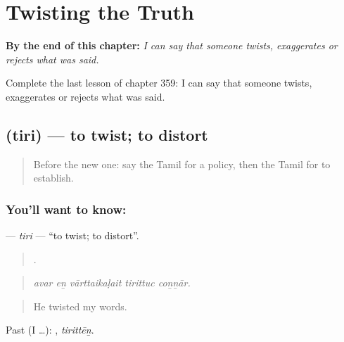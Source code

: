 
\chapter{Twisting the Truth}
\label{ch:ta-twisting-the-truth}

\begin{chapteropening}
\textbf{By the end of this chapter:} \emph{I can say that someone twists, exaggerates or rejects what was said.}

Complete the last lesson of chapter 359: I can say that someone twists, exaggerates or rejects what was said.
\end{chapteropening}

\section[\texorpdfstring{\ta{திரி} (tiri)}{திரி (tiri)}]{ (tiri) — to twist; to distort}

\label{lesson:TA-C359-tiri}



\begin{quote}
Before the new one: say the Tamil for a policy, then the Tamil for to establish.
\end{quote}

\subsection*{You'll want to know: }
\textbf{} — \emph{tiri} — \textquotedblleft{}to twist; to distort\textquotedblright{}.

\begin{quote}
    .
\end{quote}

\begin{quote}
\emph{avar eṉ vārttaikaḷait tirittuc coṉṉār.}
\end{quote}

\begin{quote}
He twisted my words.
\end{quote}

Past (I …): , \emph{tirittēṉ}.

